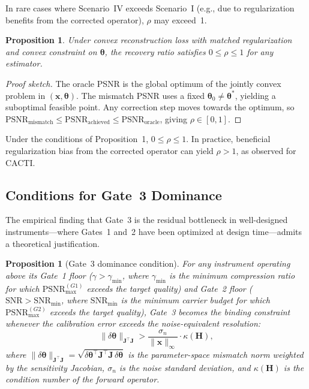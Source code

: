 \documentclass[11pt]{article}
\newtheorem{proposition}[theorem]{Proposition}
\begin{document}
\noindent In rare cases where Scenario~IV exceeds Scenario~I (e.g., due to
regularization benefits from the corrected operator), $\rho$ may exceed~1.

\begin{proposition}
Under convex reconstruction loss with matched regularization and convex constraint on
$\boldsymbol{\theta}$, the recovery ratio satisfies $0 \leq \rho \leq 1$
for any estimator.
\end{proposition}

\begin{proof}[Proof sketch]
The oracle PSNR is the global optimum of the jointly convex problem in
$(\mathbf{x}, \boldsymbol{\theta})$.  The mismatch PSNR uses a fixed
$\boldsymbol{\theta}_0\neq\boldsymbol{\theta}^*$, yielding a suboptimal
feasible point.  Any correction step moves towards the optimum, so
$\mathrm{PSNR}_{\mathrm{mismatch}} \leq \mathrm{PSNR}_{\mathrm{achieved}}
\leq \mathrm{PSNR}_{\mathrm{oracle}}$, giving $\rho\in[0,1]$.
\end{proof}

\noindent Under the conditions of Proposition~1, $0 \leq \rho \leq 1$. In practice, beneficial regularization bias from the corrected operator can yield $\rho > 1$, as observed for CACTI.

\subsection{Conditions for Gate~3 Dominance}

The empirical finding that Gate~3 is the residual bottleneck in well-designed instruments---where Gates~1 and~2 have been optimized at design time---admits a theoretical justification.

\begin{proposition}[Gate~3 dominance condition]
For any instrument operating above its Gate~1 floor ($\gamma > \gamma_{\min}$, where $\gamma_{\min}$ is the minimum compression ratio for which $\mathrm{PSNR}_{\max}^{(G1)}$ exceeds the target quality) and Gate~2 floor ($\mathrm{SNR} > \mathrm{SNR}_{\min}$, where $\mathrm{SNR}_{\min}$ is the minimum carrier budget for which $\mathrm{PSNR}_{\max}^{(G2)}$ exceeds the target quality), Gate~3 becomes the binding constraint whenever the calibration error exceeds the noise-equivalent resolution:
\begin{equation}
  \|\delta\boldsymbol{\theta}\|_{\mathbf{J}^\top\mathbf{J}}
  > \frac{\sigma_n}{\|\mathbf{x}\|_\infty} \cdot \kappa(\mathbf{H}),
  \label{eq:gate3_dominance}
\end{equation}
where $\|\delta\boldsymbol{\theta}\|_{\mathbf{J}^\top\mathbf{J}} = \sqrt{\delta\boldsymbol{\theta}^\top \mathbf{J}^\top\mathbf{J}\, \delta\boldsymbol{\theta}}$ is the parameter-space mismatch norm weighted by the sensitivity Jacobian, $\sigma_n$ is the noise standard deviation, and $\kappa(\mathbf{H})$ is the condition number of the forward operator.
\end{proposition}
\end{document}
